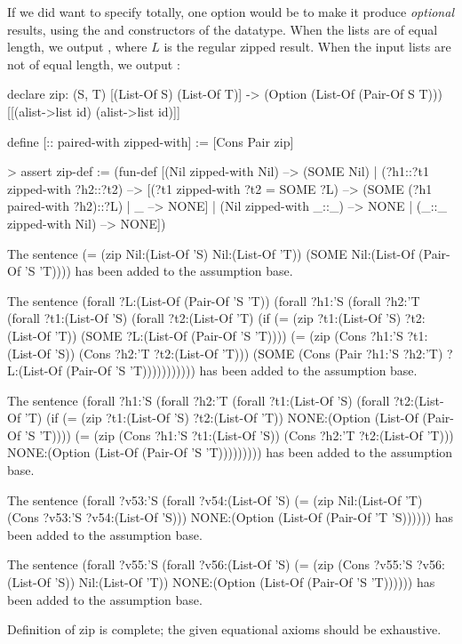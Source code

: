 If we did want to specify  totally, one option would be 
to make it produce {\em optional\/} results, using the 
and  constructors of the  datatype. When
the lists are of equal length, we output , where
$L$ is the regular zipped result. When the input lists are not 
of equal length, we output : 
\begin{tcAthena}
declare zip: (S, T) [(List-Of S) (List-Of T)] -> (Option (List-Of (Pair-Of S T)))
                          [[(alist->list id) (alist->list id)]]

define [:: paired-with zipped-with] := [Cons Pair zip]

> assert zip-def  := 
    (fun-def [(Nil zipped-with Nil) --> (SOME Nil)
            | (?h1::?t1 zipped-with ?h2::?t2) -->
                  [(?t1 zipped-with ?t2 = SOME ?L) --> (SOME (?h1 paired-with ?h2)::?L)
                 | _ --> NONE]
            | (Nil zipped-with _::_) --> NONE
            | (_::_ zipped-with Nil) --> NONE])
       
The sentence 
(= (zip Nil:(List-Of 'S)
        Nil:(List-Of 'T))
   (SOME Nil:(List-Of (Pair-Of 'S 'T))))
has been added to the assumption base.

The sentence 
(forall ?L:(List-Of (Pair-Of 'S 'T))
  (forall ?h1:'S
    (forall ?h2:'T
      (forall ?t1:(List-Of 'S)
        (forall ?t2:(List-Of 'T)
          (if (= (zip ?t1:(List-Of 'S)
                      ?t2:(List-Of 'T))
                 (SOME ?L:(List-Of (Pair-Of 'S 'T))))
              (= (zip (Cons ?h1:'S
                            ?t1:(List-Of 'S))
                      (Cons ?h2:'T
                            ?t2:(List-Of 'T)))
                 (SOME (Cons (Pair ?h1:'S ?h2:'T)
                             ?L:(List-Of (Pair-Of 'S 'T)))))))))))
has been added to the assumption base.

The sentence 
(forall ?h1:'S
  (forall ?h2:'T
    (forall ?t1:(List-Of 'S)
      (forall ?t2:(List-Of 'T)
        (if (= (zip ?t1:(List-Of 'S)
                    ?t2:(List-Of 'T))
               NONE:(Option (List-Of (Pair-Of 'S 'T))))
            (= (zip (Cons ?h1:'S
                          ?t1:(List-Of 'S))
                    (Cons ?h2:'T
                          ?t2:(List-Of 'T)))
               NONE:(Option (List-Of (Pair-Of 'S 'T)))))))))
has been added to the assumption base.

The sentence 
(forall ?v53:'S
  (forall ?v54:(List-Of 'S)
    (= (zip Nil:(List-Of 'T)
            (Cons ?v53:'S
                  ?v54:(List-Of 'S)))
       NONE:(Option (List-Of (Pair-Of 'T 'S))))))
has been added to the assumption base.

The sentence 
(forall ?v55:'S
  (forall ?v56:(List-Of 'S)
    (= (zip (Cons ?v55:'S
                  ?v56:(List-Of 'S))
            Nil:(List-Of 'T))
       NONE:(Option (List-Of (Pair-Of 'S 'T))))))
has been added to the assumption base.

Definition of zip is complete; the given equational axioms should be exhaustive.
\end{tcAthena}

